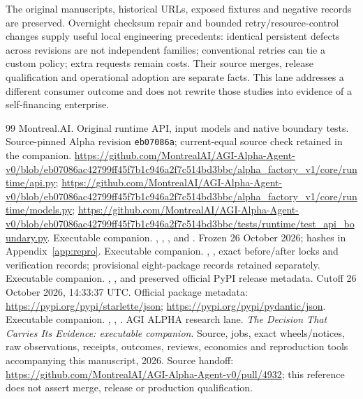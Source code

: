 \documentclass[11pt,a4paper]{article}
\begin{document}
The original manuscripts, historical URLs, exposed fixtures and negative records are preserved. Overnight checksum repair and bounded retry/resource-control changes supply useful local engineering precedents: identical persistent defects across revisions are not independent families; conventional retries can tie a custom policy; extra requests remain costs. Their source merges, release qualification and operational adoption are separate facts. This lane addresses a different consumer outcome and does not rewrite those studies into evidence of a self-financing enterprise.\cite{ecosystem}

\begin{thebibliography}{99}\small\setlength{\itemsep}{0.15em}\setlength{\parskip}{0pt}
 Montreal.AI. Original runtime API, input models and native boundary tests. Source-pinned Alpha revision \texttt{eb07086a}; current-equal source check retained in the companion. \url{https://github.com/MontrealAI/AGI-Alpha-Agent-v0/blob/eb07086ac42799ff45f7b1c946a2f7c514bd3bbc/alpha_factory_v1/core/runtime/api.py}; \url{https://github.com/MontrealAI/AGI-Alpha-Agent-v0/blob/eb07086ac42799ff45f7b1c946a2f7c514bd3bbc/alpha_factory_v1/core/runtime/models.py}; \url{https://github.com/MontrealAI/AGI-Alpha-Agent-v0/blob/eb07086ac42799ff45f7b1c946a2f7c514bd3bbc/tests/runtime/test_api_boundary.py}.
 Executable companion. , , , and . Frozen 26 October 2026; hashes in Appendix~\ref{app:repro}.
 Executable companion. , , exact before/after locks and verification records; provisional eight-package records retained separately.
 Executable companion. , , and preserved official PyPI release metadata. Cutoff 26 October 2026, 14:33:37 UTC. Official package metadata: \url{https://pypi.org/pypi/starlette/json}; \url{https://pypi.org/pypi/pydantic/json}.
 Executable companion. , , .
 AGI ALPHA research lane. \emph{The Decision That Carries Its Evidence: executable companion}. Source, jobs, exact wheels/notices, raw observations, receipts, outcomes, reviews, economics and reproduction tools accompanying this manuscript, 2026. Source handoff: \url{https://github.com/MontrealAI/AGI-Alpha-Agent-v0/pull/4932}; this reference does not assert merge, release or production qualification.

\end{thebibliography}
\end{document}

